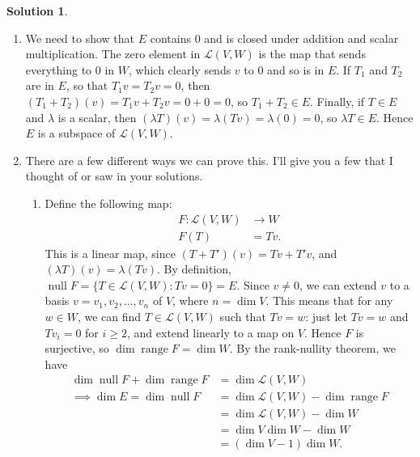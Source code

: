 \documentclass[12pt]{article}
\theoremstyle{definition}
\theoremstyle{definition}
\newtheorem*{soln}{Solution}
\newcommand{\Null}{\operatorname{null}}
\newcommand{\range}{\operatorname{range}}
\begin{document}
\begin{soln}
\begin{enumerate}[label=\arabic*.]
\item We need to show that $E$ contains $0$ and is closed under addition and scalar multiplication. The zero element in $\mathcal{L}(V,W)$ is the map that sends everything to $0$ in $W$, which clearly sends $v$ to $0$ and so is in $E$. If $T_1$ and $T_2$ are in $E$, so that $T_1v=T_2v=0$, then $(T_1+T_2)(v)=T_1v+T_2v=0+0=0$, so $T_1+T_2\in E$. Finally, if $T\in E$ and $\lambda$ is a scalar, then $(\lambda T)(v)=\lambda(Tv)=\lambda(0)=0$, so $\lambda T\in E$. Hence $E$ is a subspace of $\mathcal{L}(V,W)$.

\item There are a few different ways we can prove this. I'll give you a few that I thought of or saw in your solutions.
\begin{enumerate}[label=\textbf{Method \arabic*.}]
\item Define the following map:
\begin{align*}
F:\mathcal{L}(V,W) &\to W\\
F(T) &= Tv.
\end{align*}
This is a linear map, since $(T+T')(v)=Tv+T'v$, and $(\lambda T)(v)=\lambda (Tv)$. By definition, $\Null F=\{T\in\mathcal{L}(V,W):Tv=0\}=E$. Since $v\neq 0$, we can extend $v$ to a basis $v=v_1,v_2,\dots,v_n$ of $V$, where $n=\dim V$. This means that for any $w\in W$, we can find $T\in\mathcal{L}(V,W)$ such that $Tv=w$: just let $Tv=w$ and $Tv_i=0$ for $i\geq 2$, and extend linearly to a map on $V$. Hence $F$ is surjective, so $\dim \range F=\dim W$. By the rank-nullity theorem, we have
\begin{align*}
\dim \Null F+\dim\range F &= \dim\mathcal{L}(V,W)\\
\implies \dim E = \dim\Null F &= \dim \mathcal{L}(V,W)-\dim\range F\\
&=\dim\mathcal{L}(V,W)-\dim W\\
&= \dim V\dim W-\dim W\\
&=(\dim V-1)\dim W.
\end{align*}


\end{enumerate}
\end{enumerate}
\end{soln}
\end{document}
